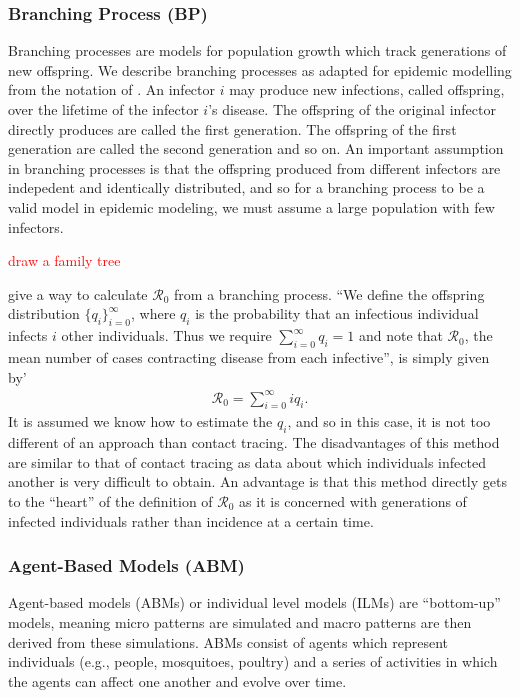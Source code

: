 \documentclass[12pt]{article}
\newcommand{\com}[1]{\textcolor{red}{ #1}}
\newcommand{\rr}{\ensuremath{\mathcal{R}_0}}
\begin{document}

\subsubsection{Branching Process (BP)}
\label{sec:branching-process}

Branching processes are models for population growth which track generations of new offspring.  We describe branching processes as adapted for epidemic modelling from the notation of \cite{grimmett1991}.  An infector $i$ may produce new infections, called offspring, over the lifetime of the  infector $i$'s disease.  The offspring of the original infector directly produces are called the first generation.  The offspring of the first generation are called the second generation and so on.  An important assumption in branching processes is that the offspring produced from different infectors are indepedent and identically distributed, and so for a branching process to be a valid model in epidemic modeling, we must assume a large population with few infectors.

\com{draw a family tree}

\cite{getz2006} give a way to calculate $\rr$ from a branching process.  ``We define the offspring distribution $\{q_i \}_{i=0}^\infty$, where $q_i$  is the probability that an infectious individual infects $i$ other individuals.  Thus we require $\sum_{i=0}^\infty q_i =1$ and note that $\rr$, the mean number of cases contracting disease from each infective'', is simply given by'
  \begin{align*}
    \rr = \sum_{i=0}^\infty iq_i.
  \end{align*}
  It is assumed we know how to estimate the $q_i$, and so in this case, it is not too different of an approach than contact tracing.  The disadvantages of this method are similar to that of contact tracing as data about which individuals  infected another is very difficult to obtain.  An advantage is that this method directly gets to the ``heart'' of the definition of $\rr$ as it is concerned with generations of infected individuals rather than incidence at a certain time.


    

\subsubsection{Agent-Based Models (ABM)}
\label{sec:agent-based-models}
Agent-based models (ABMs) or individual level models (ILMs) are ``bottom-up'' models, meaning micro patterns are simulated and macro patterns are then derived from these simulations.  ABMs consist of agents which represent individuals (e.g., people, mosquitoes, poultry) and a series of activities in which the agents can affect one another and evolve over time.
\end{document}
